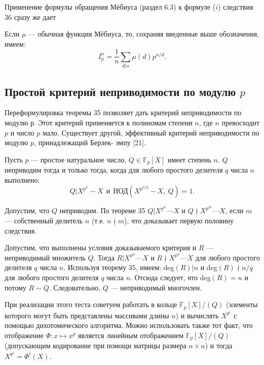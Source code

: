 \documentclass{mai_book}
\begin{document}
Применение формулы обращения Мёбиуса (раздел 6.3) к формуле 
($i$) следствия 36 сразу же дает 

\begin{sled}
\hspace*{15pt}Если $\mu$ — обычная функция Мёбиуса, то, сохраняя введенные выше 
обозначения, имеем: 
\begin{equation*}
I^n_p = \frac{1}{n}\sum_{d|n}\mu(d)p^{n \slash d}.
\end{equation*}
\end{sled}
\newpage

\subsection{Простой критерий неприводимости по модулю $p$}
Переформулировка теоремы 35 позволяет дать критерий  
неприводимости по модулю $р$. Этот критерий применяется к полиномам степени 
$n$, где $n$ превосходит $p$ и число $p$ мало. Существует другой,  
эффективный критерий неприводимости по модулю $p$, принадлежащий Берлек- 
эмпу [21]. \newline\newline
\begin{sled}
\hspace*{15pt}Пусть $p$ — простое натуральное число, $Q \in \mathbb{F}_p [X]$ имеет степень $n$. $Q$ 
неприводим тогда и только тогда, когда для любого простого делителя 
$q$ числа $n$ выполнено: 
\begin{equation*}
Q|X^{p^n} - X\:\: \textit{и} \:\: \text{НОД}(X^{p^{n\slash q}} - X,\:Q)=1.
\end{equation*}
\end{sled}

\begin{myproof}
Допустим, что $Q$ неприводим. По теореме 35 $Q | X^{p^n} — X$ и 
$Q \nmid X^{p^m} — X$, если $m$ — собственный делитель $n$ (т.е. $n \nmid m$), что 
доказывает первую половину следствия.
 
\noindent Допустим, что выполнены условия доказываемого критерия и $R$ — 
неприводимый множитель $Q$. Тогда $R | X^{p^n} — X$ и $R \nmid X^{p^n} — X$ для 
любого простого делителя $q$ числа $n$. Используя теорему 35, имеем: 
deg$(R) | n$ и deg$(R) \nmid n \slash q$ для любого простого делителя $q$ числа $n$. 
Отсюда следует, что deg$(R) = n$ и потому $R \sim Q$. Следовательно, 
$Q$ — неприводимый многочлен.
\end{myproof}

\begin{mynotice}
При реализации этого теста советуем работать в 
кольце $\mathbb{F}_p[X]\slash(Q)$ (элементы которого могут быть представлены 
массивами длины $n$) и вычислять $X^{p^i}$ с помощью  
дихотомического алгоритма. Можно использовать также тот факт, что  
отображение $ \Phi: x \mapsto x^p$ является линейным отображением $\mathbb{F}_p[X]\slash(Q)$ 
(допускающим кодирование при помощи матрицы размера $n \times n$) 
и тогда $X^{p^i} = \Phi^i(X)$.\newline 
\end{mynotice}
\end{document}
